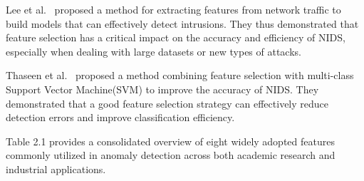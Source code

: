 \begin{ZhChapter}
    Lee et al.~\cite{lee2000framework} proposed a method for extracting features from network traffic to build models that can effectively detect intrusions. They thus demonstrated that feature selection has a critical impact on the accuracy and efficiency of NIDS, especially when dealing with large datasets or new types of attacks.

    Thaseen et al.~\cite{thaseen2017intrusion} proposed a method combining feature selection with multi-class Support Vector Machine(SVM) to improve the accuracy of NIDS. They demonstrated that a good feature selection strategy can effectively reduce detection errors and improve classification efficiency.

    Table 2.1 provides a consolidated overview of eight widely adopted features commonly utilized in anomaly detection across both academic research and industrial applications.



\end{ZhChapter}
